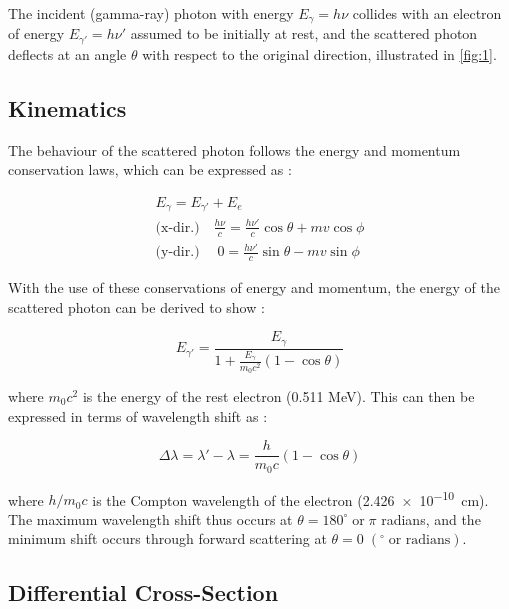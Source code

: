 \documentclass[11pt, a4paper, twocolumn]{article}
\begin{document}
The incident (gamma-ray) photon with energy $E_{\gamma}=h\nu$ collides with an electron of energy $E_{\gamma'}=h\nu'$ assumed to be initially at rest, and the scattered photon deflects at an angle $\theta$ with respect to the original direction, illustrated in \autoref{fig:1}. \cite{knoll2010radiation,cryst11050525,UCD_PHYC30090_Part3,UCD_comptonlab}

\subsection{Kinematics}

The behaviour of the scattered photon follows the energy and momentum conservation laws, which can be expressed as \cite{UCD_comptonlab}:

\vspace{-2ex}
\begin{gather}
  E_{\gamma} = E_{\gamma'} + E_e \\[2ex]
  \text{(x-dir.)}\quad \frac{h\nu}{c} = \frac{h\nu'}{c}\cos\theta + mv\cos\phi \\
  \text{(y-dir.)}\quad\; 0 = \frac{h\nu'}{c}\sin\theta - mv\sin\phi
\end{gather}

With the use of these conservations of energy and momentum, the energy of the scattered photon can be derived to show \cite{knoll2010radiation,UCD_PHYC30090_Part3,UCD_comptonlab,cryst11050525,PRATT2010124}:

\begin{equation} \label{eq:1}
  E_{\gamma'} = \frac{E_{\gamma}}{1+\frac{E_{\gamma}}{m_0c^2}(1-\cos\theta)}
\end{equation}

where $m_0c^2$ is the energy of the rest electron (0.511 MeV). This can then be expressed in terms of wavelength shift as \cite{UCD_PHYC30090_Part3,rybicki2024radiative}:

\begin{equation}
  \Delta\lambda = \lambda' - \lambda = \frac{h}{m_0c}(1-\cos\theta)
\end{equation}

where $h/m_0c$ is the Compton wavelength of the electron (\qty{2.426e-10}{cm}). The maximum wavelength shift thus occurs at $\theta=180^{\circ} \; \text{or}\; \pi$ radians, and the minimum shift occurs through forward scattering at $\theta=0 \;(^{\circ}\;\text{or radians})$. \cite{UCD_PHYC30090_Part3}

\subsection{Differential Cross-Section}
\end{document}
